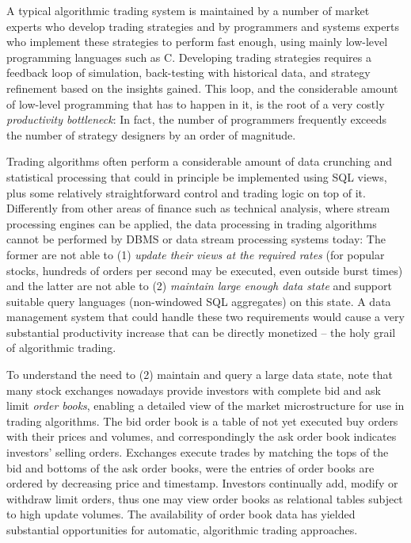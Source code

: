 A typical algorithmic trading system is maintained by a number of market experts who develop trading strategies and by programmers and systems experts who implement these strategies to perform fast enough, using mainly low-level programming languages such as C. Developing trading strategies requires a feedback loop of simulation, back-testing with historical data, and strategy refinement based on the insights gained. This loop, and the considerable amount of low-level programming that has to happen in it, is the root of a very costly {\em productivity bottleneck}\/: In fact, the number of programmers frequently exceeds the number of strategy designers by an order of magnitude.

Trading algorithms often perform a considerable amount of data crunching and statistical processing that could in principle be implemented using SQL views, plus some relatively straightforward control and trading logic on top of it. 
%
Differently from other areas of finance such as technical analysis,
where stream processing engines
\cite{abadi-vldbj:03,motwani-cidr:03} can be applied,
the data processing in trading algorithms cannot be performed by DBMS or data stream processing systems today: The former are not able to (1) {\em update their views at the required rates}\/ (for popular stocks, hundreds of orders per second may be executed, even outside burst times)
and the latter are not able to (2) {\em maintain large enough data state}\/ and support suitable query languages (non-windowed SQL aggregates) on this state.
%
A data management system that could handle these two requirements would cause a very substantial productivity increase that can be directly monetized -- the holy grail of algorithmic trading.

To understand the need to (2) maintain and query a large data state, note that
many stock exchanges nowadays provide investors with complete bid and ask limit {\em order books}\/, enabling a detailed view of the market microstructure for use in trading algorithms. The bid order book is a table of not yet executed buy orders with their prices and volumes, and correspondingly the ask order book indicates investors' selling
orders. Exchanges execute trades by matching the tops of the bid and bottoms of the ask order
books, were the entries of order books are ordered by decreasing price and timestamp. Investors continually add, modify or withdraw limit orders, thus one may view order books as relational tables subject to high update volumes.
The availability of order book data has yielded substantial opportunities for automatic, algorithmic trading approaches. 

